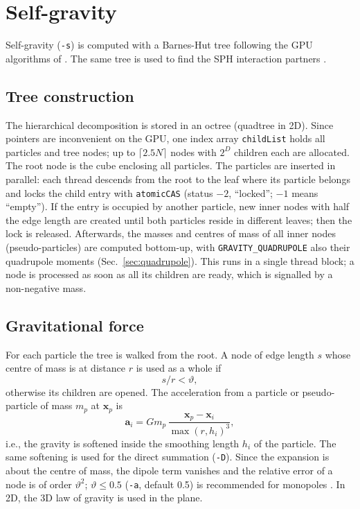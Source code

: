 \documentclass[10pt,fleqn,twoside]{article}
\renewcommand{\vec}[1]{{\mathbf #1}}
\newcommand{\code}[1]{\texttt{#1}}
\newcommand{\sw}[1]{\texttt{#1}}
\begin{document}
\section{Self-gravity}
\label{sec:self-gravity}

Self-gravity (\code{-s}) is computed with a Barnes-Hut tree \citep{1986Natur.324..446B} following the GPU algorithms
of \citet{burtscher:2011}. The same tree is used to find the SPH interaction partners \citep{hernquist:1989}.

\subsection{Tree construction}
The hierarchical decomposition is stored in an octree (quadtree in 2D). Since pointers are inconvenient on the GPU, one
index array \code{childList} holds all particles and tree nodes; up to $\lceil 2.5N\rceil$ nodes with $2^D$ children
each are allocated. The root node is the cube enclosing all particles. The particles are inserted in parallel: each
thread descends from the root to the leaf where its particle belongs and locks the child entry with
\code{atomicCAS} (status $-2$, ``locked''; $-1$ means ``empty''). If the entry is occupied by another particle, new
inner nodes with half the edge length are created until both particles reside in different leaves; then the lock is
released. Afterwards, the masses and centres of mass of all inner nodes (pseudo-particles) are computed bottom-up,
with \sw{GRAVITY\_QUADRUPOLE} also their quadrupole moments (Sec.~\ref{sec:quadrupole}). This runs in a single
thread block; a node is processed as soon as all its children are ready, which is signalled by a non-negative mass.

\subsection{Gravitational force}
For each particle the tree is walked from the root. A node of edge length $s$ whose centre of mass is at distance $r$
is used as a whole if
\begin{equation}
 s/r < \vartheta,
 \label{eq:bh-criterion}
\end{equation}
otherwise its children are opened. The acceleration from a particle or pseudo-particle of mass $m_p$ at $\vec x_p$ is
\begin{equation}
 \vec a_i = G m_p\,\frac{\vec x_p - \vec x_i}{\max(r, h_i)^3},
 \label{eq:monopole}
\end{equation}
i.e., the gravity is softened inside the smoothing length $h_i$ of the particle. The same softening is used for the
direct summation (\code{-D}). Since the expansion is about the centre of mass, the dipole term vanishes and the
relative error of a node is of order $\vartheta^2$; $\vartheta \leq 0.5$ (\code{-a}, default 0.5) is recommended
for monopoles \citep{1989ApJS...70..389B}. In 2D, the 3D law of gravity is used in the plane.
\end{document}
